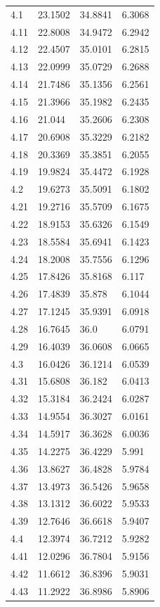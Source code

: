 \begin{tabular}{llll}
4.1 & 23.1502 & 34.8841 & 6.3068 \\
4.11 & 22.8008 & 34.9472 & 6.2942 \\
4.12 & 22.4507 & 35.0101 & 6.2815 \\
4.13 & 22.0999 & 35.0729 & 6.2688 \\
4.14 & 21.7486 & 35.1356 & 6.2561 \\
4.15 & 21.3966 & 35.1982 & 6.2435 \\
4.16 & 21.044 & 35.2606 & 6.2308 \\
4.17 & 20.6908 & 35.3229 & 6.2182 \\
4.18 & 20.3369 & 35.3851 & 6.2055 \\
4.19 & 19.9824 & 35.4472 & 6.1928 \\
4.2 & 19.6273 & 35.5091 & 6.1802 \\
4.21 & 19.2716 & 35.5709 & 6.1675 \\
4.22 & 18.9153 & 35.6326 & 6.1549 \\
4.23 & 18.5584 & 35.6941 & 6.1423 \\
4.24 & 18.2008 & 35.7556 & 6.1296 \\
4.25 & 17.8426 & 35.8168 & 6.117 \\
4.26 & 17.4839 & 35.878 & 6.1044 \\
4.27 & 17.1245 & 35.9391 & 6.0918 \\
4.28 & 16.7645 & 36.0 & 6.0791 \\
4.29 & 16.4039 & 36.0608 & 6.0665 \\
4.3 & 16.0426 & 36.1214 & 6.0539 \\
4.31 & 15.6808 & 36.182 & 6.0413 \\
4.32 & 15.3184 & 36.2424 & 6.0287 \\
4.33 & 14.9554 & 36.3027 & 6.0161 \\
4.34 & 14.5917 & 36.3628 & 6.0036 \\
4.35 & 14.2275 & 36.4229 & 5.991 \\
4.36 & 13.8627 & 36.4828 & 5.9784 \\
4.37 & 13.4973 & 36.5426 & 5.9658 \\
4.38 & 13.1312 & 36.6022 & 5.9533 \\
4.39 & 12.7646 & 36.6618 & 5.9407 \\
4.4 & 12.3974 & 36.7212 & 5.9282 \\
4.41 & 12.0296 & 36.7804 & 5.9156 \\
4.42 & 11.6612 & 36.8396 & 5.9031 \\
4.43 & 11.2922 & 36.8986 & 5.8906 \\

\end{tabular}
